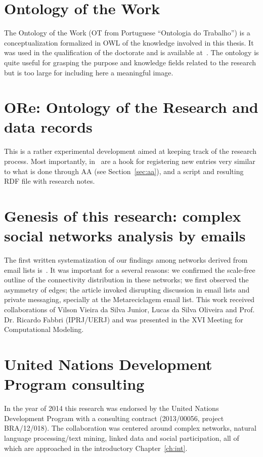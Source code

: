 \begin{apendicesenv}
\section{Ontology of the Work}
The Ontology of the Work (OT from Portuguese ``Ontologia do Trabalho'')
is a conceptualization formalized in OWL of the knowledge involved in this thesis.
It was used in the qualification of the doctorate and is available at~\cite{OT}.
The ontology is quite useful for grasping the purpose and knowledge fields related to
the research but is too large for including here a meaningful image.

\section{ORe: Ontology of the Research and data records}
This is a rather experimental development aimed at keeping track
of the research process.
Most importantly, in~\cite{ore} are a hook for registering new entries
very similar to what is done through AA (see Section~\ref{sec:aa}), and a script and resulting RDF file
with research notes.

\section{Genesis of this research: complex social networks analysis by emails}
The first written systematization of our findings among networks derived from email lists
is~\cite{comp1}.
It was important for a several reasons: we confirmed the scale-free outline of the connectivity distribution
in these networks;
we first observed the asymmetry of edges;
the article invoked disrupting discussion in email lists and private messaging, specially at the Metareciclagem email list.
This work received collaborations of Vilson Vieira da Silva Junior, Lucas da Silva Oliveira
and Prof. Dr. Ricardo Fabbri (IPRJ/UERJ)
and was presented in the XVI Meeting for Computational Modeling.

\section{United Nations Development Program consulting}\label{sec:undp}
In the year of 2014 this research was endorsed by the United Nations Development Program
with a consulting contract (2013/00056, project BRA/12/018).
The collaboration was centered around complex networks,
natural language processing/text mining, linked data and social participation,
all of which are approached in the introductory Chapter~\ref{ch:int}.


\end{apendicesenv}
